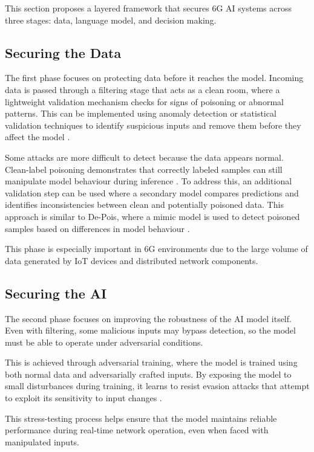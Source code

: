 \documentclass[letterpaper]{article} %
\begin{document}
This section proposes a layered framework that secures 6G AI systems across three stages: data, language model, and decision making.

\subsection {Securing the Data}

The first phase focuses on protecting data before it reaches the model. Incoming data is passed through a filtering stage that acts as a clean room, where a lightweight validation mechanism checks for signs of poisoning or abnormal patterns. This can be implemented using anomaly detection or statistical validation techniques to identify suspicious inputs and remove them before they affect the model \cite{Chen_Zhang_Zhang_Wang_Liu_2021}.

Some attacks are more difficult to detect because the data appears normal. Clean-label poisoning demonstrates that correctly labeled samples can still manipulate model behaviour during inference \cite{NEURIPS2018_22722a34}. To address this, an additional validation step can be used where a secondary model compares predictions and identifies inconsistencies between clean and potentially poisoned data. This approach is similar to De-Pois, where a mimic model is used to detect poisoned samples based on differences in model behaviour \cite{Chen_Zhang_Zhang_Wang_Liu_2021}.

This phase is especially important in 6G environments due to the large volume of data generated by IoT devices and distributed network components.

\subsection {Securing the AI}

The second phase focuses on improving the robustness of the AI model itself. Even with filtering, some malicious inputs may bypass detection, so the model must be able to operate under adversarial conditions.

This is achieved through adversarial training, where the model is trained using both normal data and adversarially crafted inputs. By exposing the model to small disturbances during training, it learns to resist evasion attacks that attempt to exploit its sensitivity to input changes \cite{Catak_Catak_Moldsvor_2021}.

This stress-testing process helps ensure that the model maintains reliable performance during real-time network operation, even when faced with manipulated inputs.
\end{document}
